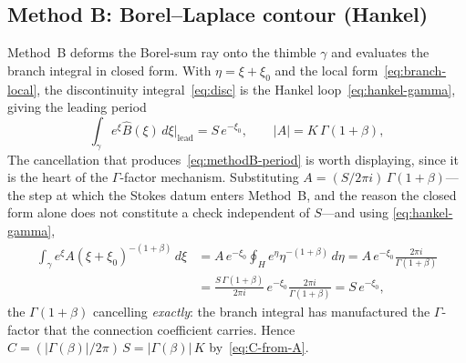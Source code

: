 \documentclass[11pt,reqno]{amsart}
\renewcommand{\_}{\vquadorigunderscore\allowbreak}
\theoremstyle{plain}
\theoremstyle{definition}
\newcommand{\Bhat}{\widehat{B}}
\newcommand{\xizero}{\xi_0}
\providecommand{\C}{}\renewcommand{\C}{C}
\begin{document}
\subsection{Method B: Borel--Laplace contour (Hankel)}\label{sub:methodB}
Method~B deforms the Borel-sum ray onto the thimble $\gamma$ and evaluates the branch integral in
closed form. With $\eta=\xi+\xizero$ and the local form~\eqref{eq:branch-local}, the
discontinuity integral~\eqref{eq:disc} is the Hankel loop~\eqref{eq:hankel-gamma}, giving the
leading period
\begin{equation}\label{eq:methodB-period}
  \int_\gamma e^{\xi}\Bhat(\xi)\,d\xi\Big|_{\text{lead}}=S\,e^{-\xizero},\qquad
  \lvert A\rvert=K\,\Gamma(1+\beta),
\end{equation}
The cancellation that produces~\eqref{eq:methodB-period} is worth displaying, since it is the heart
of the $\Gamma$-factor mechanism. Substituting $A=(S/2\pi i)\,\Gamma(1+\beta)$---the step at which
the Stokes datum enters Method~B, and the reason the closed form alone does not constitute a check
independent of $S$---and using \eqref{eq:hankel-gamma},
\begin{equation}\label{eq:methodB-chain}
\begin{split}
  \int_\gamma e^{\xi}A(\xi+\xizero)^{-(1+\beta)}\,d\xi
  &=A\,e^{-\xizero}\!\oint_{H}e^{\eta}\eta^{-(1+\beta)}\,d\eta
  =A\,e^{-\xizero}\frac{2\pi i}{\Gamma(1+\beta)}\\
  &=\frac{S\,\Gamma(1+\beta)}{2\pi i}\,e^{-\xizero}\frac{2\pi i}{\Gamma(1+\beta)}
  =S\,e^{-\xizero},
\end{split}
\end{equation}
the $\Gamma(1+\beta)$ cancelling \emph{exactly}: the branch integral has manufactured the
$\Gamma$-factor that the connection coefficient carries. Hence
$\C=(\lvert\Gamma(\beta)\rvert/2\pi)\,S=\lvert\Gamma(\beta)\rvert\,K$
by~\eqref{eq:C-from-A}.
\end{document}
